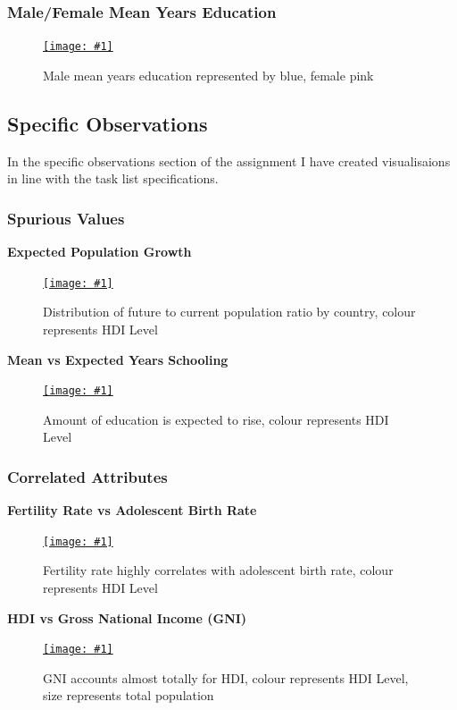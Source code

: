 \documentclass[11pt,a4paper,final]{article}
\newcommand\onlinefig[3]{
\begin{figure}[H]
  \centering
  \href{#3}{\texttt{[image: \#1]}}
  \caption{#2} 
  \label{fig:#1}
\end{figure}
}
\begin{document}
\begin{multicols}{2}
\subsubsection{Male/Female Mean Years Education}
\onlinefig{men_vs_women_mean_years_education_barchart}{Male mean years education represented by blue, female pink}{https://public.tableau.com/views/CS3205-HDI/Sheet2?:language=en-GB&:display_count=n&:origin=viz_share_link}


\subsection{Specific Observations}
In the specific observations section of the assignment I have created visualisaions in line with the task list specifications.

\subsubsection{Spurious Values}
\textbf{Expected Population Growth}
\onlinefig{population_growth_ratio_boxplot}{Distribution of future to current population ratio by country, colour represents HDI Level}{https://public.tableau.com/views/CS3205-HDI/Sheet11?:language=en-GB&:display_count=n&:origin=viz_share_link}

\begin{flushleft}
\textbf{Mean vs Expected Years Schooling}
\end{flushleft}
\vspace{-2cm}
\onlinefig{mean_vs_expected_years_schooling_scatterplot.png}{Amount of education is expected to rise, colour represents HDI Level}{https://public.tableau.com/views/CS3205-HDI/Sheet7?:language=en-GB&:display_count=n&:origin=viz_share_link}

\subsubsection{Correlated Attributes}
\begin{flushleft}
\textbf{Fertility Rate vs Adolescent Birth Rate}
\end{flushleft}
\onlinefig{fertility_vs_adolescent_birth_rate_scatterplot}{Fertility rate highly correlates with adolescent birth rate, colour represents HDI Level}{https://public.tableau.com/views/CS3205-HDI/Sheet10?:language=en-GB&:display_count=n&:origin=viz_share_link}

\begin{flushleft}
\textbf{HDI vs Gross National Income (GNI)}
\end{flushleft}
\onlinefig{gni_vs_hdi_scatterplot}{GNI accounts almost totally for HDI, colour represents HDI Level, size represents total population}{https://public.tableau.com/views/CS3205-HDI/Sheet5?:language=en-GB&:display_count=n&:origin=viz_share_link}


\end{multicols}
\end{document}
